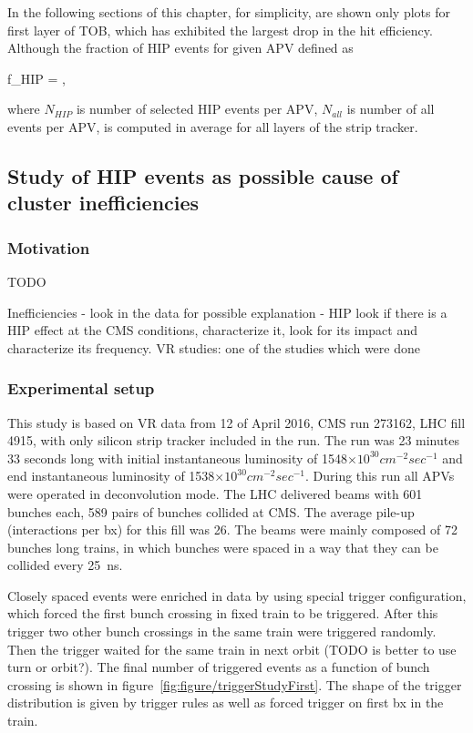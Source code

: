 In the following sections of this chapter, for simplicity, are shown only plots for first layer of TOB, which has exhibited the largest drop in the hit efficiency. Although the fraction of HIP events for given APV defined as


{
f_{HIP} = ,
}

where $N_{HIP}$ is number of selected HIP events per APV, $N_{all}$ is number of all events per APV, is computed in average for all layers of the strip tracker.


\subsection{Study of HIP events as possible cause of cluster inefficiencies~\label{sec:firstStudy}}

\subsubsection{Motivation}

TODO

Inefficiencies - look in the data for possible explanation - HIP
look if there is a HIP effect at the CMS conditions, characterize it, look for its impact and characterize its frequency.
VR studies: one of the studies which were done

\subsubsection{Experimental setup} 

This study is based on VR data from 12 of April 2016, CMS run 273162, LHC fill 4915, with only silicon strip tracker included in the run. The run was 23 minutes 33 seconds long with initial instantaneous luminosity of 1548$\times 10^{30} cm^{-2} sec^{-1}$ and end instantaneous luminosity of 1538$\times 10^{30} cm^{-2} sec^{-1}$. During this run all APVs were operated in deconvolution mode. The LHC delivered beams with 601 bunches each, 589 pairs of bunches collided at CMS. The average pile-up (interactions per bx) for this fill was 26. The beams were mainly composed of 72 bunches long trains, in which bunches were spaced in a way that they can be collided every 25~ns.

Closely spaced events were enriched in data by using special trigger configuration, which forced the first bunch crossing in fixed train to be triggered. After this trigger two other bunch crossings in the same train were triggered randomly. Then the trigger waited for the same train in next orbit (TODO is better to use turn or orbit?). The final number of triggered events as a function of bunch crossing is shown in figure~\ref{fig:figure/triggerStudyFirst}. The shape of the trigger distribution is given by trigger rules as well as forced trigger on first bx in the train.

